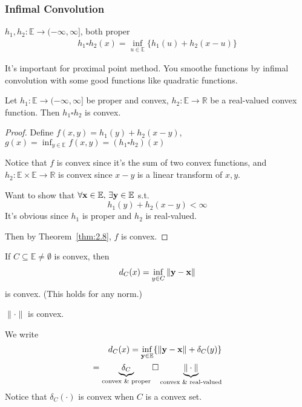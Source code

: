 \documentclass[11pt]{article}
\begin{document}
\subsubsection{Infimal Convolution}
\begin{definition}
    $h_1,h_2: \mathbb{E} \to (-\infty,\infty]$, both proper
    \begin{align*}
        h_1 \square h_2(x) = \inf_{u \in \mathbb{E}}\{ h_1(u)+h_2(x-u) \}
    \end{align*}
\end{definition}
\begin{remark}
    It's important for proximal point method. You smoothe functions by infimal convolution with 
    some good functions like quadratic functions.
\end{remark}

\vspace{15mm}
\vspace{15mm}

\begin{theorem}
    Let $h_1: \mathbb{E} \to (-\infty,\infty]$ be proper and convex, $h_2: \mathbb{E}
    \to \mathbb{R}$ be a real-valued convex function. Then $h_1 \square h_2$ is convex.
\end{theorem}
\begin{proof}
    Define $f(x,y) = h_1(y) + h_2(x-y)$, $g(x) = \inf_{y\in \mathbb{E}}f(x,y) = 
    (h_1 \square h_2)(x)$

    Notice that $f$ is convex since it's the sum of two convex functions, and $h_2: \mathbb{E} \times 
    \mathbb{E} \to \mathbb{R}$ is convex since $x-y$ is a linear transform of $x,y$.

    Want to show that $\forall {\mathbf{x}} \in \mathbb{E},\, \exists {\mathbf{y}} \in \mathbb{E}$ s.t.
    \begin{equation}
        h_1(y) + h_2(x-y) < \infty
    \end{equation}
    It's obvious since $h_1$ is proper and $h_2$ is real-valued.

    Then by Theorem~\ref{thm:2.8}, $f$ is convex.
\end{proof}

\begin{example}
    \item If $C \subseteq \mathbb{E} \neq \emptyset$ is convex, then 
    \begin{align*}
        d_{C}(x) = \inf_{y \in C} \| {\mathbf{y}} - {\mathbf{x}} \| 
    \end{align*}
    is convex. (This holds for any norm.) 
    \begin{remark}
        $\| \cdot  \| $ is convex.
    \end{remark}
    We write 
    \begin{align*}
        d_{C}(x) = \inf_{\vy \in \mathbb{E}}\{ \| \vy-\vx \|  + \delta_{C}(y)\}\\
        = \underbrace{\delta_{C}}_{\text{convex  \& proper}}  \square \underbrace{\| \cdot  \| }_{\text{convex \& 
        real-valued}}
    \end{align*}
    Notice that
    $\delta_{C}(\cdot )$ is convex when $C$ is a convex set.
\end{example}
\end{document}
